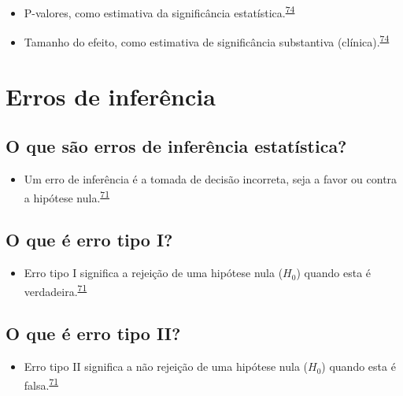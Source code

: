 \documentclass[
]{book}
\providecommand{\tightlist}{%
  \setlength{\itemsep}{0pt}\setlength{\parskip}{0pt}}
\begin{document}
\begin{itemize}
\item
  P-valores, como estimativa da significância estatística.\textsuperscript{\protect\hyperlink{ref-Sullivan2012}{74}}
\item
  Tamanho do efeito, como estimativa de significância substantiva (clínica).\textsuperscript{\protect\hyperlink{ref-Sullivan2012}{74}}
\end{itemize}

\hypertarget{erros-de-inferuxeancia}{%
\section{Erros de inferência}\label{erros-de-inferuxeancia}}

\hypertarget{o-que-suxe3o-erros-de-inferuxeancia-estatuxedstica}{%
\subsection{O que são erros de inferência estatística?}\label{o-que-suxe3o-erros-de-inferuxeancia-estatuxedstica}}

\begin{itemize}
\tightlist
\item
  Um erro de inferência é a tomada de decisão incorreta, seja a favor ou contra a hipótese nula.\textsuperscript{\protect\hyperlink{ref-Curran-Everett2009}{71}}
\end{itemize}

\hypertarget{o-que-uxe9-erro-tipo-i}{%
\subsection{O que é erro tipo I?}\label{o-que-uxe9-erro-tipo-i}}

\begin{itemize}
\tightlist
\item
  Erro tipo I significa a rejeição de uma hipótese nula (\(H_{0}\)) quando esta é verdadeira.\textsuperscript{\protect\hyperlink{ref-Curran-Everett2009}{71}}
\end{itemize}

\hypertarget{o-que-uxe9-erro-tipo-ii}{%
\subsection{O que é erro tipo II?}\label{o-que-uxe9-erro-tipo-ii}}

\begin{itemize}
\tightlist
\item
  Erro tipo II significa a não rejeição de uma hipótese nula (\(H_{0}\)) quando esta é falsa.\textsuperscript{\protect\hyperlink{ref-Curran-Everett2009}{71}}
\end{itemize}
\end{document}
